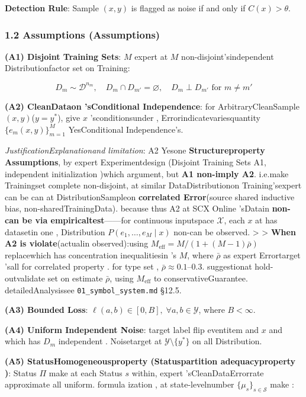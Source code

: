 \documentclass[
  12pt,
]{article}
\begin{document}
\textbf{Detection Rule}: Sample \((x, y)\) is flagged as noise if and only if
\(C(x) > \theta\). 

\subsubsection{1.2 Assumptions (Assumptions)}\label{ux5047ux8bbe-assumptions}

\textbf{(A1) Disjoint Training Sets}: \(M\) expert at  \(M\)
non-disjoint'sindependent Distributionfactor set on Training: 

\[D_m \sim \mathcal{D}^{n_m}, \quad D_m \cap D_{m'} = \varnothing, \quad D_m \perp D_{m'} \text{ for } m \neq m'\]

\textbf{(A2) CleanDataon 'sConditional Independence}: for ArbitraryCleanSample
\((x, y)\)(\(y = y^*\)), give  \(x\) 'sconditionsunder , Errorindicatevariesquantity 
\(\{e_m(x, y)\}_{m=1}^M\) YesConditional Independence's. 

\emph{JustificationExplanationand limitation}: A2
Yesone \textbf{Structureproperty Assumptions}, by expert Experimentdesign (Disjoint Training Sets
A1, independent initialization )which argument, but \textbf{A1 non-imply
A2}. i.e.make Trainingset complete non-disjoint, at similar DataDistributionon Training'sexpert can be can at DistributionSampleon \textbf{correlated Error}(source shared inductive bias, non-sharedTrainingData). because thus
A2 at  SCX Online 'sDatain \textbf{non-can be via empiricaltest}------for continuous inputspace 
\(\mathcal{X}\), each  \(x\) at has datasetin one , Distribution
\(P(e_1, \dots, e_M \mid x)\) non-can be observed.  \textgreater{} \textgreater{}
\textbf{When A2 is violate}(actualin observed):using 
\(M_{\text{eff}} = M/(1 + (M-1)\bar{\rho})\) replacewhich has concentration inequalitiesin 's
\(M\), where \(\bar{\rho}\)
as expert Errortarget 'sall for correlated property . for type set , \(\bar{\rho} \approx 0.1\)--\(0.3\). suggestionat hold-outvalidate set on estimate
\(\bar{\rho}\), using  \(M_{\text{eff}}\) to conservativeGuarantee. detailedAnalysissee
\texttt{01\_symbol\_system.md} §12.5. 

\textbf{(A3) Bounded Loss}:
\(\ell(a, b) \in [0, B], \; \forall a, b \in \mathcal{Y}\), where
\(B < \infty\). 

\textbf{(A4) Uniform Independent Noise}: target label flip eventitem and  \(x\) and which has  \(D_m\)
independent . Noisetarget at  \(\mathcal{Y} \setminus \{y^*\}\) on all Distribution. 

\textbf{(A5) StatusHomogeneousproperty  (Statuspartition adequacyproperty )}: Status \(\Pi\)
make at each Status \(s\)
within, expert 'sCleanDataErrorrate approximate all uniform. formula ization , at state-levelnumber 
\(\{\mu_s\}_{s \in \mathcal{S}}\) make : 
\end{document}
